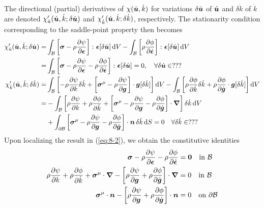 The directional (partial) derivatives of $\chi(\dot{\bm {u}},\dot{k})$ for 
variations $\delta\dot{\bm {u}}$ of $\dot{\bm {u}}$ and $\delta\dot{k}$ of 
$\dot{k}$ are denoted $\chi'_{\dot{u}}(\dot{\bm {u}},\dot{k};\delta\dot{\bm {u}})$ 
and $\chi'_{\dot{k}}(\dot{\bm {u}},\dot{k};\delta\dot{k})$, respectively. 
The stationarity condition corresponding to the saddle-point property then becomes
\begin{subequations}\label{eq:8-2}
    \begin{align}
    \chi'_{\dot{u}}(\dot{\bm {u}},\dot{k};\delta\dot{\bm {u}})
    =&
    \int_{\mathcal{B}}  \left[\bm{\sigma} - \rho\frac{\partial \psi}{\partial \bm{\epsilon}}\right] \colon \bm{\epsilon}[\delta\dot{\bm {u}}]  \mathop{}\!\mathrm{d} V -
     \int_{\mathcal{B}}  \left[\rho\frac{\partial \phi}{\partial \dot{\bm{\epsilon}}}\right] \colon \bm{\epsilon}[\delta\dot{\bm {u}}]  \mathop{}\!\mathrm{d} V
    \nonumber \\
    =&
    \int_{\mathcal{B}} \left[\bm{\sigma} - \rho\frac{\partial \psi}{\partial \bm{\epsilon}} -  
    \rho\frac{\partial \phi}{\partial \dot{\bm{\epsilon}}} \right] \colon \bm{\epsilon}[\delta\dot{\bm {u}}]  = 0,
    \quad \forall \delta\dot{\bm {u}}\in ???
\label{eq:8-2a}\\
    \chi'_{\dot{k}}(\dot{\bm {u}},\dot{k};\delta\dot{k})
    =&
    \int_{\mathcal{B}}  \left[-\rho\frac{\partial \psi}{\partial k} \delta\dot{k} +
    \left[\bm{\sigma}^{\mathrm{\mu}} - \rho\frac{\partial \psi}{\partial \bm {g}}\right] \cdot \bm {g}[\delta\dot{k}]\right]  \mathop{}\!\mathrm{d} V -
    \int_{\mathcal{B}}  \left[\rho\frac{\partial \phi}{\partial \dot{k}} \delta\dot{k} + 
    \rho\frac{\partial \phi}{\partial \dot{\bm {g}}} \cdot \bm {g}[\delta\dot{k}]\right]  \mathop{}\!\mathrm{d} V
    \nonumber \\
    =&
     -\int_{\mathcal{B}} \left[\rho\frac{\partial \psi}{\partial k} + \rho\frac{\partial \phi}{\partial \dot{k}} +
     \left[\bm{\sigma}^{\mathrm{\mu}} - \rho\frac{\partial \psi}{\partial \bm {g}} - \rho\frac{\partial \phi}{\partial \dot{\bm {g}}}\right]
      \cdot {\bm\nabla}\right]\delta\dot{k} \mathop{}\!\mathrm{d} V
    \nonumber \\
     &+ \int_{\partial\mathcal{B}} \left[\bm{\sigma}^{\mathrm{\mu}} - \rho\frac{\partial \psi}{\partial \bm {g}} - 
     \rho\frac{\partial \phi}{\partial \dot{\bm {g}}}\right] \cdot \bm{n}\, \delta\dot{k}\mathop{}\!\mathrm{d} S = 0
    \quad \forall \delta\dot{k}\in ???
\label{eq:8-2b}
    \end{align}
\end{subequations}
Upon localizing the result in (\ref{eq:8-2}), we obtain the constitutive identities
\begin{subequations}\label{eq:8-203}
    \begin{align}
    \bm{\sigma} - \rho \frac{\partial \psi}{\partial \bm{\epsilon}} -  
    \rho \frac{\partial \phi}{\partial \dot{\bm{\epsilon}}} &= \bm{0} \quad
    \mbox{in } \mathcal{B}
\label{eq:8-203a}\\
    \rho\frac{\partial \psi}{\partial k} + \rho\frac{\partial \phi}{\partial \dot{k}} +
    \bm{\sigma}^{\mathrm{\mu}}\cdot {\bm\nabla} - \left[\rho\frac{\partial \psi}{\partial \bm {g}} + 
    \rho\frac{\partial \phi}{\partial \dot{\bm {g}}}\right] \cdot {\bm\nabla} &= 0 \quad
    \mbox{in }  \mathcal{B}
\label{eq:8-203b} \\
    \bm{\sigma}^{\mathrm{\mu}}\cdot \bm{n} - \left[\rho\frac{\partial \psi}{\partial \bm {g}} + 
    \rho\frac{\partial \phi}{\partial \dot{\bm {g}}}\right] \cdot \bm{n} &= 0 \quad
    \mbox{on }  \partial\mathcal{B}
\label{eq:8-203c}
    \end{align}
\end{subequations}
